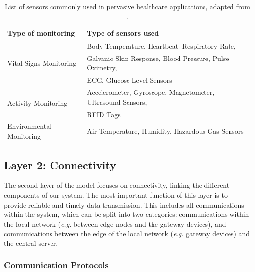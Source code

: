 \begin{table}[H]
    \centering
    \begin{tabular}{l|l}
        \textbf{Type of monitoring} & \textbf{Type of sensors used} \\ 
        \hline
        \multirow{3}{*}{Vital Signs Monitoring} & Body Temperature, Heartbeat, Respiratory Rate, \\ & Galvanic Skin Response, Blood Pressure, Pulse Oximetry, \\ & \acf{ECG}, Glucose Level Sensors \\ \hline
        \multirow{2}{*}{Activity Monitoring} & Accelerometer, Gyroscope, Magnetometer, Ultrasound Sensors,\\ & \acf{RFID} Tags\\
        \hline
        \multirow{1}{*}{Environmental Monitoring} & Air Temperature, Humidity, Hazardous Gas Sensors \\
    \end{tabular}
    \caption[List of sensors commonly used in pervasive healthcare applications]{List of sensors commonly used in pervasive healthcare applications, adapted from \cite{MinhDang2019}.}
    \label{tab:layer1-sensors}
\end{table}


\subsection{Layer 2: Connectivity}
\label{sec:iot-model-layer2}


The second layer of the model focuses on connectivity, linking the different components of our system. The most important function of this layer is to provide reliable and timely data transmission. This includes all communications within the system, which can be split into two categories: communications within the local network (\textit{e.g.} between edge nodes and the gateway devices), and communications between the edge of the local network (\textit{e.g.} gateway devices) and the central server. \bigskip

\subsubsection{Communication Protocols}

